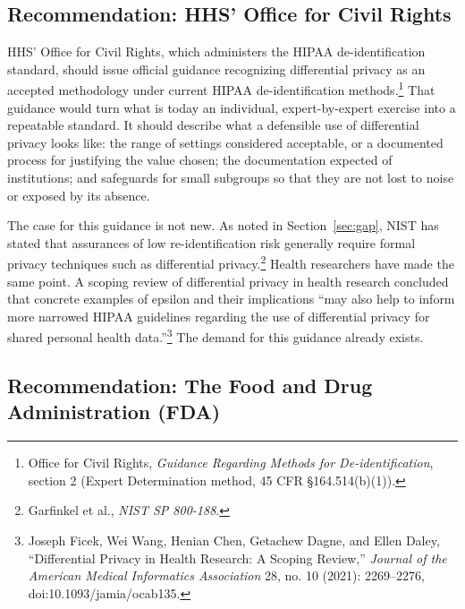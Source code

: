 \documentclass[11pt]{article}
\begin{document}
\subsection{Recommendation: HHS' Office for Civil Rights}

HHS' Office for Civil Rights, which administers the HIPAA de-identification standard, should issue official guidance recognizing differential privacy as an accepted methodology under current HIPAA de-identification methods.\footnote{Office for Civil Rights, \textit{Guidance Regarding Methods for De-identification}, section 2 (Expert Determination method, 45 CFR \S164.514(b)(1)).} That guidance would turn what is today an individual, expert-by-expert exercise into a repeatable standard. It should describe what a defensible use of differential privacy looks like: the range of settings considered acceptable, or a documented process for justifying the value chosen; the documentation expected of institutions; and safeguards for small subgroups so that they are not lost to noise or exposed by its absence.

The case for this guidance is not new. As noted in Section~\ref{sec:gap}, NIST has stated that assurances of low re-identification risk generally require formal privacy techniques such as differential privacy.\footnote{Garfinkel et al., \textit{NIST SP 800-188}.} Health researchers have made the same point. A scoping review of differential privacy in health research concluded that concrete examples of epsilon and their implications ``may also help to inform more narrowed HIPAA guidelines regarding the use of differential privacy for shared personal health data.''\footnote{Joseph Ficek, Wei Wang, Henian Chen, Getachew Dagne, and Ellen Daley, ``Differential Privacy in Health Research: A Scoping Review,'' \textit{Journal of the American Medical Informatics Association} 28, no. 10 (2021): 2269--2276, doi:10.1093/jamia/ocab135.} The demand for this guidance  already exists.

\subsection{Recommendation: The Food and Drug Administration (FDA)}
\end{document}
